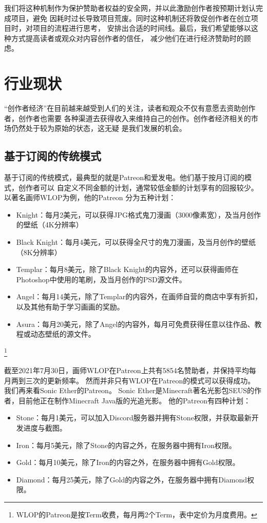 \documentclass[11pt,UTF8,a4paper]{ctexart}
\begin{document}
    我们将这种机制作为保护赞助者权益的安全网，并以此激励创作者按预期计划认完成项目，避免
    因耗时过长导致项目荒废。同时这种机制还将敦促创作者在创立项目时，对项目的流程进行思考，
    安排出合适的时间线。最后，我们希望能够以这种方式提高读者或观众对内容创作者的信任，
    减少他们在进行经济赞助时的顾虑。


    \section{行业现状}\label{sec:now}

    “创作者经济”在目前越来越受到人们的关注，读者和观众不仅有意愿去资助创作者，创作者也需要
    各种渠道去获得收入来维持自己的创作。创作者经济相关的市场仍然处于较为原始的状态，这无疑
    是我们发展的机会。

    \subsection{基于订阅的传统模式}\label{subsec:tradition_patreon}

    基于订阅的传统模式，最典型的就是Patreon和爱发电。他们基于按月订阅的模式，创作者可以
    自定义不同金额的计划，通常较低金额的计划享有的回报较少。以著名画师WLOP为例，他的Patreon
    分为五种计划\cite{wlop_patreon}：
    \begin{itemize}
        \item Knight：每月2美元，可以获得JPG格式鬼刀漫画（3000像素宽），及当月创作的壁纸（4K分辨率）
        \item Black Knight：每月4美元，可以获得全尺寸的鬼刀漫画，及当月创作的壁纸（8K分辨率）
        \item Templar：每月8美元，除了Black Knight的内容外，还可以获得画师在Photoshop中使用的笔刷，及当月创作的PSD源文件。
        \item Angel：每月14美元，除了Templar的内容外，在画师自营的商店中享有折扣，以及其他有助于学习画画的奖励。
        \item Asura：每月20美元，除了Angel的内容外，每月可免费获得任意以往作品、教程或动态壁纸的源文件。
    \end{itemize}\footnote{WLOP的Patreon是按Term收费，每月两2个Term，表中定价为月度费用。}

    截至2021年7月30日，画师WLOP在Patreon上共有5854名赞助者，并保持平均每月两到三次的更新频率。
    然而并非只有WLOP在Patreon的模式可以获得成功。 我们再来看Sonic Ether的Patreon。
    Sonic Ether是Minecraft著名光影包SEUS的作者，目前他正在制作Minecraft Java版的光追光影。
    他的Patreon有四种计划\cite{seus_patreon}：
    \begin{itemize}
        \item Stone：每月1美元，可以加入Discord服务器并拥有Stone权限，并获取最新开发进度与截图。
        \item Iron：每月5美元，除了Stone的内容之外，在服务器中拥有Iron权限。
        \item Gold：每月10美元，除了Iron的内容之外，在服务器中拥有Gold权限。
        \item Diamond：每月25美元，除了Gold的内容之外，在服务器中拥有Diamond权限。
    \end{itemize}
\end{document}
